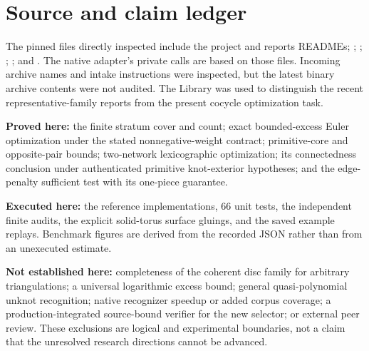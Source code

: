 \documentclass[11pt,letterpaper]{article}
\theoremstyle{definition}
\begin{document}
\section{Source and claim ledger}\label{app:ledger}
The pinned files directly inspected include the project and reports READMEs; ; ; ; ; and . The native adapter's private calls are based on those files. Incoming archive names and intake instructions were inspected, but the latest binary archive contents were not audited. The Library was used to distinguish the recent representative-family reports from the present cocycle optimization task.

\textbf{Proved here:} the finite stratum cover and count; exact bounded-excess Euler optimization under the stated nonnegative-weight contract; primitive-core and opposite-pair bounds; two-network lexicographic optimization; its connectedness conclusion under authenticated primitive knot-exterior hypotheses; and the edge-penalty sufficient test with its one-piece guarantee.

\textbf{Executed here:} the reference implementations, 66 unit tests, the independent finite audits, the explicit solid-torus surface gluings, and the saved example replays. Benchmark figures are derived from the recorded JSON rather than from an unexecuted estimate.

\textbf{Not established here:} completeness of the coherent disc family for arbitrary triangulations; a universal logarithmic excess bound; general quasi-polynomial unknot recognition; native recognizer speedup or added corpus coverage; a production-integrated source-bound verifier for the new selector; or external peer review. These exclusions are logical and experimental boundaries, not a claim that the unresolved research directions cannot be advanced.
\end{document}
